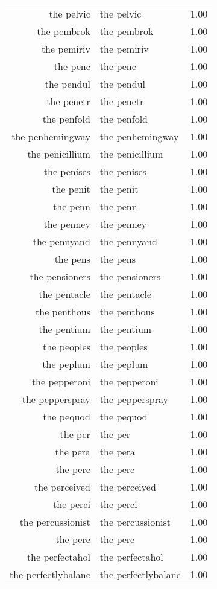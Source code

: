 \begin{table}[ht]
\begin{tabular}{rlr}
  the pelvic & the pelvic & 1.00 \\ 
  the pembrok & the pembrok & 1.00 \\ 
  the pemiriv & the pemiriv & 1.00 \\ 
  the penc & the penc & 1.00 \\ 
  the pendul & the pendul & 1.00 \\ 
  the penetr & the penetr & 1.00 \\ 
  the penfold & the penfold & 1.00 \\ 
  the penhemingway & the penhemingway & 1.00 \\ 
  the penicillium & the penicillium & 1.00 \\ 
  the penises & the penises & 1.00 \\ 
  the penit & the penit & 1.00 \\ 
  the penn & the penn & 1.00 \\ 
  the penney & the penney & 1.00 \\ 
  the pennyand & the pennyand & 1.00 \\ 
  the pens & the pens & 1.00 \\ 
  the pensioners & the pensioners & 1.00 \\ 
  the pentacle & the pentacle & 1.00 \\ 
  the penthous & the penthous & 1.00 \\ 
  the pentium & the pentium & 1.00 \\ 
  the peoples & the peoples & 1.00 \\ 
  the peplum & the peplum & 1.00 \\ 
  the pepperoni & the pepperoni & 1.00 \\ 
  the pepperspray & the pepperspray & 1.00 \\ 
  the pequod & the pequod & 1.00 \\ 
  the per & the per & 1.00 \\ 
  the pera & the pera & 1.00 \\ 
  the perc & the perc & 1.00 \\ 
  the perceived & the perceived & 1.00 \\ 
  the perci & the perci & 1.00 \\ 
  the percussionist & the percussionist & 1.00 \\ 
  the pere & the pere & 1.00 \\ 
  the perfectahol & the perfectahol & 1.00 \\ 
  the perfectlybalanc & the perfectlybalanc & 1.00 \\ 

\end{tabular}
\end{table}
